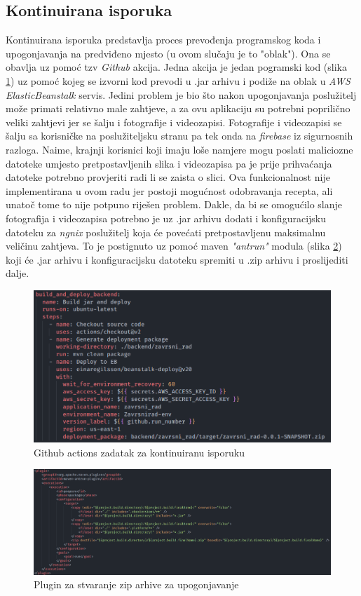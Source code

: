 \documentclass[times, utf8, zavrsni]{fer}
\begin{document}
\subsection{Kontinuirana isporuka}
Kontinuirana isporuka predstavlja proces prevođenja programskog koda i upogonjavanja na predviđeno mjesto (u ovom slučaju je to "oblak").
Ona se obavlja uz pomoć tzv \textit{Github} akcija. Jedna akcija je jedan pogramski kod
(slika \ref{fig:Backend cicd}) uz pomoć kojeg se izvorni kod prevodi u .jar arhivu i podiže na
oblak u \textit{AWS ElasticBeanstalk} servis.
Jedini problem je bio što nakon upogonjavanja poslužitelj može primati relativno male zahtjeve,
a za ovu aplikaciju su potrebni poprilično veliki zahtjevi jer se šalju i fotografije i videozapisi.
Fotografije i videozapisi se šalju sa korisničke na poslužiteljsku stranu pa tek onda
na \textit{firebase} iz sigurnosnih razloga. Naime, krajnji korisnici koji imaju loše namjere
mogu poslati maliciozne datoteke umjesto pretpostavljenih slika
i videozapisa pa je prije prihvaćanja datoteke potrebno provjeriti radi li se zaista o slici. Ova funkcionalnost
nije implementirana u ovom radu jer postoji mogućnost odobravanja recepta, ali unatoč tome to nije potpuno riješen problem.
Dakle, da bi se omogućilo slanje fotografija i videozapisa potrebno je
uz .jar arhivu  dodati i konfiguracijsku datoteku za \textit{ngnix} poslužitelj koja će povećati
pretpostavljenu maksimalnu veličinu zahtjeva. To je postignuto uz pomoć maven \textit{"antrun"} modula
(slika \ref{fig:antrun}) koji će .jar arhivu i konfiguracijsku datoteku spremiti u .zip arhivu i proslijediti dalje.
\begin{figure}[h]
      \centering
      \includegraphics[width=\textwidth]{backend_cicd.png}
      \caption{Github actions zadatak za kontinuiranu isporuku}
      \label{fig:Backend cicd}
\end{figure}
\begin{figure}[h]
      \centering
      \includegraphics[width=\textwidth]{antrun.png}
      \caption{Plugin za stvaranje zip arhive za upogonjavanje}
      \label{fig:antrun}
\end{figure}
\end{document}
